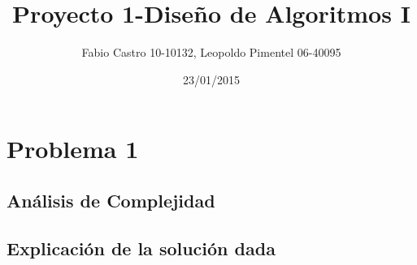 \documentclass[a4paper,10pt]{article}
\title{}
\author{}
\date{}
\begin{document}
 
\title{\Huge Proyecto 1-Diseño de Algoritmos I}



\author{Fabio Castro 10-10132, Leopoldo Pimentel 06-40095} 



\date{23/01/2015}

\maketitle
\section{Problema 1}
\subsection{Análisis de Complejidad}
  \hspace{2cm}
\begin{algorithm}                      %
\caption{}          %
\label{Problema 1}                           %
\begin{algorithmic}[1]                    %
\end{algorithmic}
\end{algorithm}
\subsection{Explicación de la solución dada}
\hspace{2cm}
\end{document}
